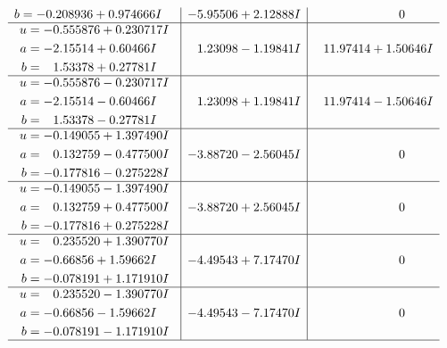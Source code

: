 \documentclass[1p]{elsarticle_modified}
\theoremstyle{definition}
\begin{document}
$$\begin{array}{c|c|c}
\begin{aligned}
b &= -0.208936 + 0.974666 I\end{aligned}
 & -5.95506 + 2.12888 I & \phantom{-0.000000 } 0 \\ \hline\begin{aligned}
u &= -0.555876 + 0.230717 I \\
a &= -2.15514 + 0.60466 I \\
b &= \phantom{-}1.53378 + 0.27781 I\end{aligned}
 & \phantom{-}1.23098 - 1.19841 I & \phantom{-}11.97414 + 1.50646 I \\ \hline\begin{aligned}
u &= -0.555876 - 0.230717 I \\
a &= -2.15514 - 0.60466 I \\
b &= \phantom{-}1.53378 - 0.27781 I\end{aligned}
 & \phantom{-}1.23098 + 1.19841 I & \phantom{-}11.97414 - 1.50646 I \\ \hline\begin{aligned}
u &= -0.149055 + 1.397490 I \\
a &= \phantom{-}0.132759 - 0.477500 I \\
b &= -0.177816 - 0.275228 I\end{aligned}
 & -3.88720 - 2.56045 I & \phantom{-0.000000 } 0 \\ \hline\begin{aligned}
u &= -0.149055 - 1.397490 I \\
a &= \phantom{-}0.132759 + 0.477500 I \\
b &= -0.177816 + 0.275228 I\end{aligned}
 & -3.88720 + 2.56045 I & \phantom{-0.000000 } 0 \\ \hline\begin{aligned}
u &= \phantom{-}0.235520 + 1.390770 I \\
a &= -0.66856 + 1.59662 I \\
b &= -0.078191 + 1.171910 I\end{aligned}
 & -4.49543 + 7.17470 I & \phantom{-0.000000 } 0 \\ \hline\begin{aligned}
u &= \phantom{-}0.235520 - 1.390770 I \\
a &= -0.66856 - 1.59662 I \\
b &= -0.078191 - 1.171910 I\end{aligned}
 & -4.49543 - 7.17470 I & \phantom{-0.000000 } 0\\
 \hline 
 \end{array}$$\newpage$$\begin{array}{c|c|c}  

\end{array}$$
\end{document}
